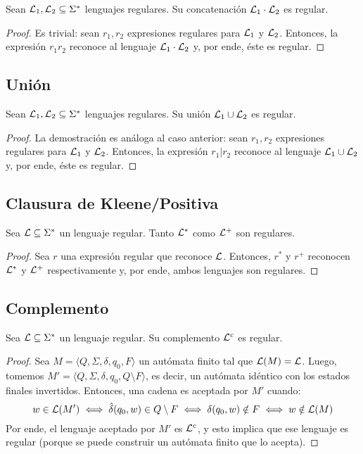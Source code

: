 \begin{theorem*}
    Sean $\mathcal{L}_1, \mathcal{L}_2 \subseteq \Sigma^*$ lenguajes regulares. Su concatenación $\mathcal{L}_1 \cdot \mathcal{L}_2$ es regular.
\end{theorem*}
\begin{proof}
    Es trivial: sean $r_1, r_2$ expresiones regulares para $\mathcal{L}_1$ y $\mathcal{L}_2$. Entonces, la expresión $r_1 r_2$ reconoce al lenguaje $\mathcal{L}_1 \cdot \mathcal{L}_2$ y, por ende, éste es regular.
\end{proof}

\subsection{Unión}

\begin{theorem*}
    Sean $\mathcal{L}_1, \mathcal{L}_2 \subseteq \Sigma^*$ lenguajes regulares. Su unión $\mathcal{L}_1 \cup \mathcal{L}_2$ es regular.
\end{theorem*}
\begin{proof}
    La demostración es análoga al caso anterior: sean $r_1, r_2$ expresiones regulares para $\mathcal{L}_1$ y $\mathcal{L}_2$. Entonces, la expresión $r_1|r_2$ reconoce al lenguaje $\mathcal{L}_1 \cup \mathcal{L}_2$ y, por ende, éste es regular.
\end{proof}

\subsection{Clausura de Kleene/Positiva}

\begin{theorem*}
    Sea $\mathcal{L} \subseteq \Sigma^*$ un lenguaje regular. Tanto $\mathcal{L}^*$ como $\mathcal{L}^+$ son regulares.
\end{theorem*}
\begin{proof}
    Sea $r$ una expresión regular que reconoce $\mathcal{L}$. Entonces, $r^*$ y $r^+$ reconocen $\mathcal{L}^*$ y $\mathcal{L}^+$ respectivamente y, por ende, ambos lenguajes son regulares.
\end{proof}

\subsection{Complemento}

\begin{theorem*}
    Sea $\mathcal{L} \subseteq \Sigma^*$ un lenguaje regular. Su complemento $\mathcal{L}^c$ es regular.
\end{theorem*}
\begin{proof}
    Sea $M = \langle Q, \Sigma, \delta, q_0, F \rangle$ un autómata finito tal que $\mathcal{L}(M) = \mathcal{L}$. Luego, tomemos $M' = \langle Q, \Sigma, \delta, q_0, Q \setminus F \rangle$, es decir, un autómata idéntico con los estados finales invertidos. Entonces, una cadena es aceptada por $M'$ cuando:
    $$
    w \in \mathcal{L}(M') \iff \hat \delta(q_0, w) \in Q \setminus F \iff \delta(q_0, w) \notin F \iff w \notin \mathcal{L}(M)
    $$
    Por ende, el lenguaje aceptado por $M'$ es $\mathcal{L}^c$, y esto implica que ese lenguaje es regular (porque se puede construir un autómata finito que lo acepta).
\end{proof}

